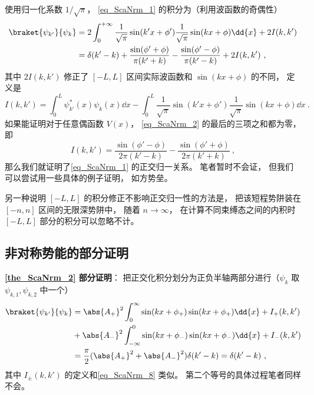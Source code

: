 使用归一化系数 $1/\sqrt{\pi}$， \autoref{eq_ScaNrm_1} 的积分为（利用波函数的奇偶性）
\begin{equation}\label{eq_ScaNrm_2}
\begin{aligned}
\braket{\psi_{k'}}{\psi_k} &= 2\int_{0}^{+\infty} \frac{1}{\sqrt{\pi}}\sin(k'x+\phi')\frac{1}{\sqrt{\pi}}\sin(kx+\phi) \dd{x} + 2I(k,k')\\
&= \delta(k'-k) + \frac{\sin(\phi'+\phi)}{\pi(k'+k)} - \frac{\sin(\phi'-\phi)}{\pi(k'-k)} + 2I(k,k')~,
\end{aligned}
\end{equation}
其中 $2I(k,k')$ 修正了 $[-L,L]$ 区间实际波函数和 $\sin(kx+\phi)$ 的不同， 定义是
\begin{equation}\label{eq_ScaNrm_8}
I(k,k') = \int_0^L \psi_{k'}^*(x) \psi_k(x) \dd{x}
-\int_{0}^{L} \frac{1}{\sqrt{\pi}}\sin(k'x+\phi') \frac{1}{\sqrt{\pi}}\sin(kx+\phi) \dd{x}~.
\end{equation}
如果能证明对于任意偶函数 $V(x)$， \autoref{eq_ScaNrm_2} 的最后的三项之和都为零， 即
\begin{equation}
I(k,k') = \frac{\sin(\phi'-\phi)}{2\pi(k'-k)} - \frac{\sin(\phi'+\phi)}{2\pi(k'+k)}~,
\end{equation}
那么我们就证明了\autoref{eq_ScaNrm_1} 的正交归一关系。 笔者暂时不会证， 但我们可以尝试用一些具体的例子证明， 如方势垒。

另一种说明 $[-L,L]$ 的积分修正不影响正交归一性的方法是， 把该短程势阱装在 $[-n,n]$ 区间的无限深势阱中， 随着 $n\to\infty$， 在计算不同束缚态之间的内积时 $[-L,L]$ 部分的积分可以忽略不计。

\subsection{非对称势能的部分证明}
\textbf{\autoref{the_ScaNrm_2} 部分证明}： 把正交化积分划分为正负半轴两部分进行（$\psi_{k}$ 取 $\psi_{k,1}, \psi_{k,2}$ 中一个）
\begin{equation}
\begin{aligned}
\braket{\psi_{k'}}{\psi_{k}} &=
\abs{A_+}^2\int_0^{\infty} \sin(kx + \phi_{+})\sin(kx + \phi_{+}) \dd{x}   + I_+(k,k')\\
&+ \abs{A_-}^2\int_{-\infty}^0 \sin(kx + \phi_{-})\sin(kx + \phi_{-}) \dd{x} + I_-(k,k')\\
&= \frac{\pi}{2}(\abs{A_+}^2 + \abs{A_-}^2)\delta(k'-k) = \delta(k'-k)~,
\end{aligned}
\end{equation}
其中 $I_{\pm}(k,k')$ 的定义和\autoref{eq_ScaNrm_8} 类似。 第二个等号的具体过程笔者同样不会。
